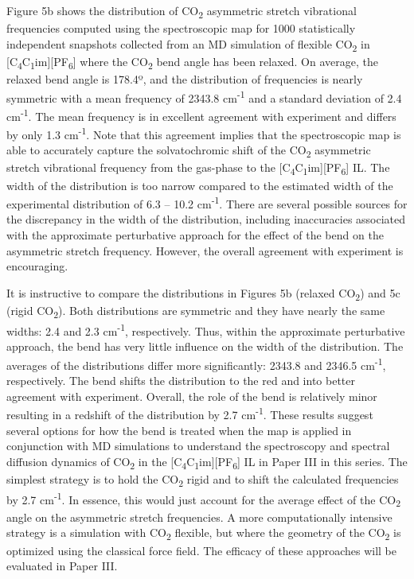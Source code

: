 \documentclass[]{article}
\begin{document}
Figure 5b shows the distribution of CO\textsubscript{2} asymmetric
stretch vibrational frequencies computed using the spectroscopic map for
1000 statistically independent snapshots collected from an MD simulation
of flexible CO\textsubscript{2} in
{[}C\textsubscript{4}C\textsubscript{1}im{]}{[}PF\textsubscript{6}{]}
where the CO\textsubscript{2} bend angle has been relaxed. On average,
the relaxed bend angle is 178.4º, and the distribution of frequencies is
nearly symmetric with a mean frequency of 2343.8 cm\textsuperscript{-1}
and a standard deviation of 2.4 cm\textsuperscript{-1}. The mean
frequency is in excellent agreement with experiment and differs by only
1.3 cm\textsuperscript{-1}. Note that this agreement implies that the
spectroscopic map is able to accurately capture the solvatochromic shift
of the CO\textsubscript{2} asymmetric stretch vibrational frequency from
the gas-phase to the
{[}C\textsubscript{4}C\textsubscript{1}im{]}{[}PF\textsubscript{6}{]}
IL. The width of the distribution is too narrow compared to the
estimated width of the experimental distribution of 6.3 -- 10.2
cm\textsuperscript{-1}. There are several possible sources for the
discrepancy in the width of the distribution, including inaccuracies
associated with the approximate perturbative approach for the effect of
the bend on the asymmetric stretch frequency. However, the overall
agreement with experiment is encouraging.

It is instructive to compare the distributions in Figures 5b (relaxed
CO\textsubscript{2}) and 5c (rigid CO\textsubscript{2}). Both
distributions are symmetric and they have nearly the same widths: 2.4
and 2.3 cm\textsuperscript{-1}, respectively. Thus, within the
approximate perturbative approach, the bend has very little influence on
the width of the distribution. The averages of the distributions differ
more significantly: 2343.8 and 2346.5 cm\textsuperscript{-1},
respectively. The bend shifts the distribution to the red and into
better agreement with experiment. Overall, the role of the bend is
relatively minor resulting in a redshift of the distribution by 2.7
cm\textsuperscript{-1}. These results suggest several options for how
the bend is treated when the map is applied in conjunction with MD
simulations to understand the spectroscopy and spectral diffusion
dynamics of CO\textsubscript{2} in the
{[}C\textsubscript{4}C\textsubscript{1}im{]}{[}PF\textsubscript{6}{]} IL
in Paper III in this series. The simplest strategy is to hold the
CO\textsubscript{2} rigid and to shift the calculated frequencies by 2.7
cm\textsuperscript{-1}. In essence, this would just account for the
average effect of the CO\textsubscript{2} angle on the asymmetric
stretch frequencies. A more computationally intensive strategy is a
simulation with CO\textsubscript{2} flexible, but where the geometry of
the CO\textsubscript{2} is optimized using the classical force field.
The efficacy of these approaches will be evaluated in Paper III.
\end{document}
